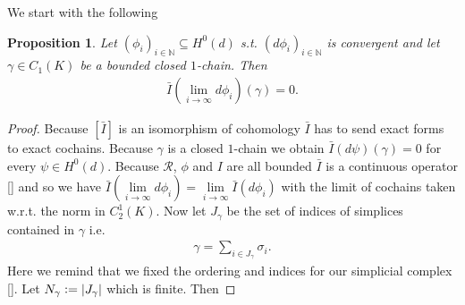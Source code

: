 \documentclass[12pt,a4paper]{article}
\numberwithin{equation}{subsection}
\numberwithin{lemma}{subsection}
\newtheorem{proposition}[lemma]{Proposition}
\theoremstyle{definition}
\newcommand{\aop}{\mathscr{A}}
\newcommand{\rop}{\mathscr{R}} %
\begin{document}
We start with the following

\begin{proposition}\label{prop:integral_exact_form_zero}
    Let $(\phi_i)_{i\in\mathbb{N}} \subseteq H^0(d)$ s.t. 
    $(d\phi_i)_{i\in\mathbb{N}}$ 
    is convergent and let $\gamma \in C_1(K)$ be a bounded closed $1$-chain.
    Then
    \begin{align*}
        \bar{I}(\lim\limits_{i \rightarrow \infty}d\phi_i)(\gamma) = 0.
    \end{align*}
\end{proposition}
\begin{proof}
    
    Because 
    $[\bar{I}]$ is an isomorphism of cohomology $\bar{I}$ has to send 
    exact forms to exact cochains. Because $\gamma$ is a closed $1$-chain 
    we obtain $\bar{I}(d\psi)(\gamma) = 0$ for every $\psi \in H^0(d)$. Because
    $\rop$, $\phi$ and $I$ are all bounded
    $\bar{I}$ is a continuous operator \ref{} and so we have 
    $\bar{I}(\lim\limits_{i \rightarrow \infty}d\phi_i) = 
    \lim\limits_{i \rightarrow \infty} \bar{I}(d\phi_i)$ with the limit of 
    cochains taken w.r.t. the norm 
    in $C^1_2(K)$. Now let $J_\gamma$ be the set of indices of simplices 
    contained in $\gamma$ i.e.
    \begin{align*}
        \gamma = \sum\limits_{i \in J_\gamma} \sigma_i.
    \end{align*}
    Here we remind that we fixed the ordering and indices for our simplicial 
    complex \ref{}. Let $N_\gamma \vcentcolon= |J_\gamma|$ which is finite. Then 


\end{proof}
\end{document}
